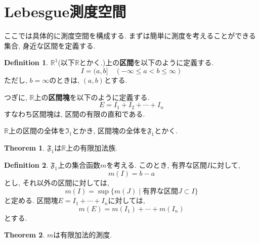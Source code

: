 \documentclass[a4j,dvipdfmx]{jsarticle}
\newcommand{\F}{\mathfrak{F}}
\newcommand{\I}{\mathfrak{I}}
\newcommand{\R}{\mathbb{R}}
\theoremstyle{definition}
\newtheorem{definition}{Definition}[section]
\theoremstyle{definition}
\newtheorem{theorem}{Theorem}[section]
\numberwithin{equation}{section}
\begin{document}
        \section{Lebesgue測度空間}
            ここでは具体的に測度空間を構成する. まずは簡単に測度を考えることができる集合, 身近な区間を定義する.

            \begin{definition}
                $\mathbb{R}^1$(以下$\mathbb{R}$とかく.)上の\textbf{区間}を以下のように定義する.
                \begin{equation}
                    I=(a,b]\quad (-\infty\leq a < b\leq \infty)
                \end{equation}
                ただし, $b=\infty$のときは, $(a,b)$とする.

                つぎに, $\mathbb{R}$上の\textbf{区間塊}を以下のように定義する.
                \begin{equation}
                    E=I_1+I_2+\cdots+I_n
                \end{equation}
                すなわち区間塊は, 区間の有限の直和である.

                $\mathbb{R}$上の区間の全体を$\I_1$とかき, 区間塊の全体を$\F_1$とかく.
            \end{definition}

            \begin{theorem}
                $\F_1$は$\R$上の有限加法族.
            \end{theorem}

            \begin{definition}
                $\F_1$上の集合函数$m$を考える. このとき, 有界な区間$I$に対して, 
                \begin{equation}
                    m(I)= b-a
                \end{equation}
                とし, それ以外の区間に対しては, 
                \begin{equation}
                    m(I)=\sup\{m(J)\mid \text{有界な区間}J\subset I\}
                \end{equation}
                と定める. 区間塊$E=I_1+\cdots+I_n$に対しては, 
                \begin{equation}
                    m(E)=m(I_1)+\cdots+m(I_n)
                \end{equation}
                とする.
            \end{definition}

            \begin{theorem}
                $m$は有限加法的測度.
            \end{theorem}
\end{document}
